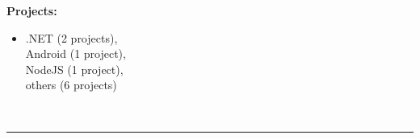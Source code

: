 \documentclass[oneside]{article}
\begin{document}
{\begin{minipage}[t][\textheight-2\fboxsep-2\fboxrule][t]{\dimexpr0.40\textwidth-2\fboxrule-2\fboxsep\relax}
        \textbf{Projects:} \\ %
        \begin{itemize}
            \setlength{\itemsep}{2pt}
            \item .NET (2 projects),\\Android (1 project),\\ NodeJS (1 project),\\others (6 projects)
           
        \end{itemize}
        \vspace{10pt} \\
        \rule{\linewidth}{0.4pt} \\

        
    \end{minipage}
}
\hfill
\end{document}
